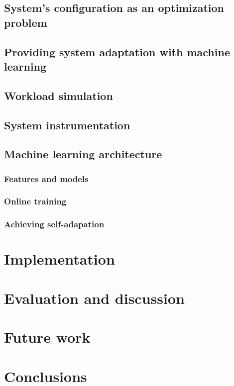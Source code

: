 \subsection{System's configuration as an optimization problem}

\subsection{Providing system adaptation with machine learning}

\subsection{Workload simulation}

\subsection{System instrumentation}

\subsection{Machine learning architecture}

\subsubsection{Features and models}

\subsubsection{Online training}

\subsubsection{Achieving self-adapation}

\section{Implementation}

\section{Evaluation and discussion}

\section{Future work}

\section{Conclusions}


\nocite{*}

\begin{acks}

\end{acks} 